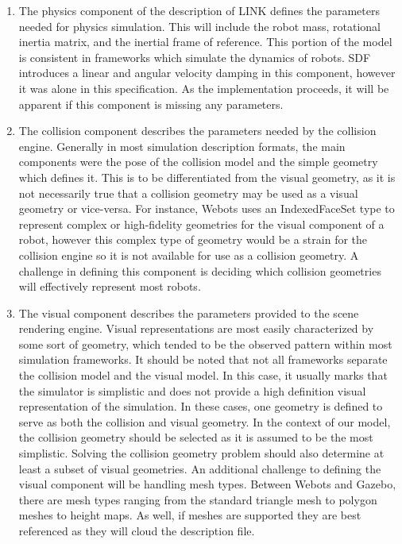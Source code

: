 \begin{enumerate}
\item The {\sc physics} component of the description of LINK defines the parameters needed for physics simulation. This will include the robot mass, rotational inertia matrix, and the inertial frame of reference. This portion of the model is consistent in frameworks which simulate the dynamics of robots. SDF introduces a linear and angular velocity damping in this component, however it was alone in this specification. As the implementation proceeds, it will be apparent if this component is missing any parameters.

\item The {\sc collision} component describes the parameters needed by the collision engine. Generally in most simulation description formats, the main components were the pose of the collision model and the simple geometry which defines it. This is to be differentiated from the visual geometry, as it is not necessarily true that a collision geometry may be used as a visual geometry or vice-versa. For instance, Webots uses an IndexedFaceSet type to represent complex or high-fidelity geometries for the visual component of a robot, however this complex type of geometry would be a strain for the collision engine so it is not available for use as a collision geometry. A challenge in defining this component is deciding which collision geometries will effectively represent most robots. 

\item The {\sc visual} component describes the parameters provided to the scene rendering engine. Visual representations are most easily characterized by some sort of geometry, which tended to be the observed pattern within most simulation frameworks. It should be noted that not all frameworks separate the collision model and the visual model. In this case, it usually marks that the simulator is simplistic and does not provide a high definition visual representation of the simulation. In these cases, one geometry is defined to serve as both the collision and visual geometry. In the context of our model, the collision geometry should be selected as it is assumed to be the most simplistic. Solving the collision geometry problem should also determine at least a subset of visual geometries. An additional challenge to defining the visual component will be handling mesh types. Between Webots and Gazebo, there are mesh types ranging from the standard triangle mesh to polygon meshes to height maps. As well, if meshes are supported they are best referenced as they will cloud the description file. 
\end{enumerate}

